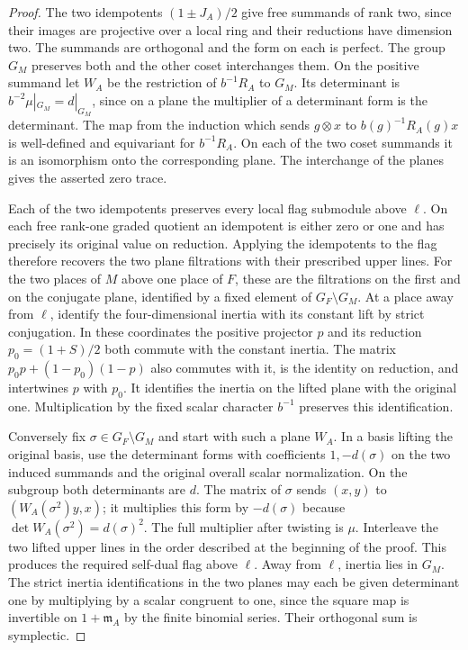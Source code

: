 \documentclass[a4paper,11pt]{article}
\theoremstyle{definition}
\theoremstyle{remark}
\numberwithin{equation}{section}
\begin{document}
\begin{proof}
The two idempotents \((1\pm J_A)/2\) give free summands of rank
two, since their images are projective over a local ring and
their reductions have dimension two. The summands are orthogonal
and the form on each is perfect. The group \(G_M\) preserves
both and the other coset interchanges them. On the positive
summand let \(W_A\) be the restriction of \(b^{-1}R_A\) to
\(G_M\). Its determinant is \(b^{-2}\mu|_{G_M}=d|_{G_M}\),
since on a plane the multiplier of a determinant form is the
determinant. The map from the induction which sends \(g\otimes x\)
to \(b(g)^{-1}R_A(g)x\) is well-defined and equivariant for
\(b^{-1}R_A\). On each of the two coset summands it is an
isomorphism onto the corresponding plane. The interchange of
the planes gives the asserted zero trace.

Each of the two idempotents preserves every local flag submodule
above \(\ell\). On each free rank-one graded quotient an idempotent
is either zero or one and has precisely its original value on
reduction. Applying the idempotents to the flag therefore recovers
the two plane filtrations with their prescribed upper lines.
For the two places of \(M\) above one place of \(F\), these are
the filtrations on the first and on the conjugate plane,
identified by a fixed element of \(G_F\setminus G_M\).
At a place away from \(\ell\), identify the four-dimensional
inertia with its constant lift by strict conjugation. In these
coordinates the positive projector \(p\) and its reduction
\(p_0=(1+S)/2\) both commute with the constant inertia.
The matrix \(p_0p+(1-p_0)(1-p)\) also commutes with it,
is the identity on reduction, and intertwines \(p\) with \(p_0\).
It identifies the inertia on the lifted plane with the original
one. Multiplication by the fixed scalar character \(b^{-1}\)
preserves this identification.

Conversely fix \(\sigma\in G_F\setminus G_M\) and start with
such a plane \(W_A\). In a basis lifting the original basis,
use the determinant forms with coefficients \(1,-d(\sigma)\)
on the two induced summands and the original overall scalar
normalization. On the subgroup both determinants are \(d\).
The matrix of \(\sigma\) sends
\((x,y)\) to \((W_A(\sigma^2)y,x)\); it multiplies this form
by \(-d(\sigma)\) because \(\det W_A(\sigma^2)=d(\sigma)^2\).
The full multiplier after twisting is \(\mu\). Interleave
the two lifted upper lines in the order described at the
beginning of the proof. This produces the required self-dual
flag above \(\ell\). Away from \(\ell\), inertia lies in
\(G_M\). The strict inertia identifications in the two planes
may each be given determinant one by multiplying by a scalar
congruent to one, since the square map is invertible on
\(1+\mathfrak m_A\) by the finite binomial series. Their
orthogonal sum is symplectic.


\end{proof}
\end{document}
